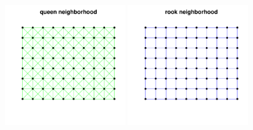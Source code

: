 \documentclass[a4paper]{article}
\begin{document}
\begin{center}
\includegraphics[width=0.4\textwidth,keepaspectratio]{figs/tutorial-ni3}
\includegraphics[width=0.4\textwidth,keepaspectratio]{figs/tutorial-ni4}
\end{center}
\end{document}

